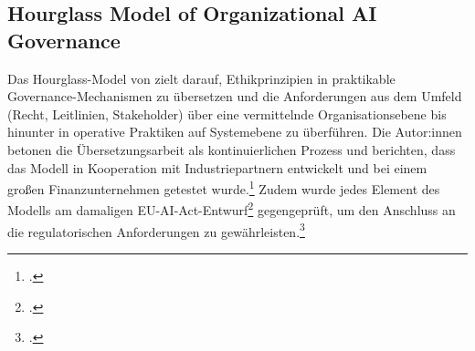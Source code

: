 \subsection{Hourglass Model of Organizational AI Governance}
\label{sec:hourglass}
Das Hourglass-Model von \cite{mantymakiPDFPuttingAI2025} zielt darauf, Ethikprinzipien in praktikable Governance-Mechanismen zu übersetzen und die Anforderungen aus dem Umfeld (Recht, Leitlinien, Stakeholder) über eine vermittelnde Organisationsebene bis hinunter in operative Praktiken auf Systemebene zu überführen.
Die Autor:innen betonen die Übersetzungsarbeit als kontinuierlichen Prozess und berichten, dass das Modell in Kooperation mit Industriepartnern entwickelt und bei einem großen Finanzunternehmen getestet wurde.\footcite[5]{mantymakiPDFPuttingAI2025}
Zudem wurde jedes Element des Modells am damaligen EU-AI-Act-Entwurf\footcite{ europeanparliamentaryresearchserviceArtificialIntelligenceAct2024} gegengeprüft, um den Anschluss an die regulatorischen Anforderungen zu gewährleisten.\footcite[3]{mantymakiPDFPuttingAI2025}

